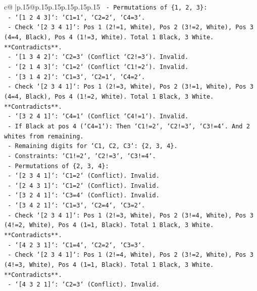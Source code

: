 \documentclass{article}
\begin{document}
{\begin{supertabular}{c@{$\;$}|p{.15\linewidth}@{}p{.15\linewidth}p{.15\linewidth}p{.15\linewidth}p{.15\linewidth}p{.15\linewidth}}
{{{\texttt{      {-} Permutations of \{1, 2, 3\}:} \\
\texttt{        {-} `{[}1 2 4 3{]}`: `C1=1`, `C2=2`, `C4=3`.} \\
\texttt{          {-} Check `{[}2 3 4 1{]}`: Pos 1 (2!=1, White), Pos 2 (3!=2, White), Pos 3 (4=4, Black), Pos 4 (1!=3, White). Total 1 Black, 3 White. **Contradicts**.} \\
\texttt{        {-} `{[}1 3 4 2{]}`: `C2=3` (Conflict `C2!=3`). Invalid.} \\
\texttt{        {-} `{[}2 1 4 3{]}`: `C1=2` (Conflict `C1!=2`). Invalid.} \\
\texttt{        {-} `{[}3 1 4 2{]}`: `C1=3`, `C2=1`, `C4=2`.} \\
\texttt{          {-} Check `{[}2 3 4 1{]}`: Pos 1 (2!=3, White), Pos 2 (3!=1, White), Pos 3 (4=4, Black), Pos 4 (1!=2, White). Total 1 Black, 3 White. **Contradicts**.} \\
\texttt{        {-} `{[}3 2 4 1{]}`: `C4=1` (Conflict `C4!=1`). Invalid.} \\
\texttt{    {-} If Black at pos 4 (`C4=1`): Then `C1!=2`, `C2!=3`, `C3!=4`. And 2 whites from remaining.} \\
\texttt{      {-} Remaining digits for `C1, C2, C3`: \{2, 3, 4\}.} \\
\texttt{      {-} Constraints: `C1!=2`, `C2!=3`, `C3!=4`.} \\
\texttt{      {-} Permutations of \{2, 3, 4\}:} \\
\texttt{        {-} `{[}2 3 4 1{]}`: `C1=2` (Conflict). Invalid.} \\
\texttt{        {-} `{[}2 4 3 1{]}`: `C1=2` (Conflict). Invalid.} \\
\texttt{        {-} `{[}3 2 4 1{]}`: `C3=4` (Conflict). Invalid.} \\
\texttt{        {-} `{[}3 4 2 1{]}`: `C1=3`, `C2=4`, `C3=2`.} \\
\texttt{          {-} Check `{[}2 3 4 1{]}`: Pos 1 (2!=3, White), Pos 2 (3!=4, White), Pos 3 (4!=2, White), Pos 4 (1=1, Black). Total 1 Black, 3 White. **Contradicts**.} \\
\texttt{        {-} `{[}4 2 3 1{]}`: `C1=4`, `C2=2`, `C3=3`.} \\
\texttt{          {-} Check `{[}2 3 4 1{]}`: Pos 1 (2!=4, White), Pos 2 (3!=2, White), Pos 3 (4!=3, White), Pos 4 (1=1, Black). Total 1 Black, 3 White. **Contradicts**.} \\
\texttt{        {-} `{[}4 3 2 1{]}`: `C2=3` (Conflict). Invalid.} \\
}}}
\end{supertabular}}
\end{document}
